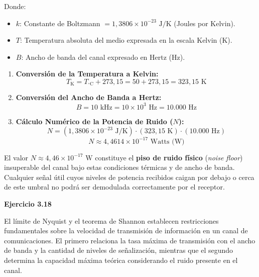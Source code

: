 \documentclass[11pt,a4paper]{article}
\begin{document}
Donde:
\begin{itemize}
    \item $k$: Constante de Boltzmann $= 1,3806 \times 10^{-23}\text{ J/K}$ (Joules por Kelvin).
    \item $T$: Temperatura absoluta del medio expresada en la escala Kelvin ($\text{K}$).
    \item $B$: Ancho de banda del canal expresado en Hertz ($\text{Hz}$).
\end{itemize}

\begin{enumerate}
    \item \textbf{Conversión de la Temperatura a Kelvin:}
    \begin{equation}
        T_{\text{K}} = T_{^\circ\text{C}} + 273,15 = 50 + 273,15 = 323,15\text{ K}
    \end{equation}

    \item \textbf{Conversión del Ancho de Banda a Hertz:}
    \begin{equation}
        B = 10\text{ kHz} = 10 \times 10^3\text{ Hz} = 10.000\text{ Hz}
    \end{equation}

    \item \textbf{Cálculo Numérico de la Potencia de Ruido ($N$):}
    \begin{equation}
        N = (1,3806 \times 10^{-23}\text{ J/K}) \cdot (323,15\text{ K}) \cdot (10.000\text{ Hz})
    \end{equation}
    \begin{equation}
        N \approx 4,4614 \times 10^{-17}\text{ Watts (W)}
    \end{equation}
\end{enumerate}

El valor $N \approx 4,46 \times 10^{-17}\text{ W}$ constituye el \textbf{piso de ruido físico} (\textit{noise floor}) insuperable del canal bajo estas condiciones térmicas y de ancho de banda. Cualquier señal útil cuyos niveles de potencia recibidos caigan por debajo o cerca de este umbral no podrá ser demodulada correctamente por el receptor.

\vspace{0.2cm}

\vspace{0.3cm}
\noindent\textbf{Ejercicio 3.18}\par
El límite de Nyquist y el teorema de Shannon establecen restricciones fundamentales sobre la velocidad de transmisión de información en un canal de comunicaciones. El primero relaciona la tasa máxima de transmisión con el ancho de banda y la cantidad de niveles de señalización, mientras que el segundo determina la capacidad máxima teórica considerando el ruido presente en el canal.
\end{document}

